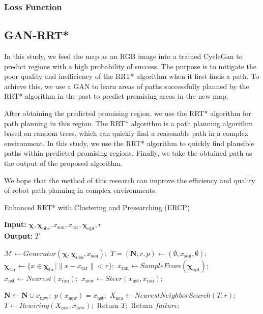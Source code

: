 \documentclass[smallcondensed]{svjour3}     %
\begin{document}
\subsubsection{Loss Function}


\subsection{GAN-RRT*}
In this study, we feed the map as an RGB image into a trained CycleGan to predict regions with a high probability of success. 
The purpose is to mitigate the poor quality and inefficiency of the RRT* algorithm when it first finds a path. 
To achieve this, we use a GAN to learn areas of paths successfully planned by the RRT* algorithm in the past to predict promising areas in the new map.

After obtaining the predicted promising region, we use the RRT* algorithm for path planning in this region.
The RRT* algorithm is a path planning algorithm based on random trees, which can quickly find a reasonable path in a complex environment. 
In this study, we use the RRT* algorithm to quickly find plausible paths within predicted promising regions. 
Finally, we take the obtained path as the output of the proposed algorithm.

We hope that the method of this research can improve the efficiency and quality of robot path planning in complex environments.

\begin{algorithm}
	\caption{Enhanced RRT* with Clustering and Presearching (ERCP)}
	\label{algorithm: ercp-RRT*}
	\hspace*{0.02in} {\bf Input:} $\bm{\chi}, \bm{\chi}_{\textrm{obs}}, x_{\textrm{sou}}, x_{\textrm{tar}}, \bm{\chi}_{\textrm{opt}}, r$ \\
	\hspace*{0.02in} {\bf Output:} $T$
	\begin{algorithmic}[1]
		\State $\mathcal{M} \leftarrow Generator(\bm{\chi}, \bm{\chi}_{\textrm{obs}}, x_{\textrm{sou}}); $
		\State $T = (\mathbf{N}, r, p) \leftarrow (\emptyset, x_{\textrm{sou}}, \emptyset) ;$
		\State $\bm{\chi}_{\textrm{tar}} \leftarrow \{x \in \bm{\chi}_{\textrm{fre}} \vert \lVert x - x_{\textrm{tar}} \rVert < r\} ;$
			\State $x_{\textrm{ran}} \leftarrow SampleFrom(\bm{\chi}_{\textrm{opt}}) ;$
			\State $x_{\textrm{nst}} \leftarrow Nearest(x_{\textrm{ran}}) ;$
			\State $x_{\textrm{new}} \leftarrow Steer(x_{\textrm{nst}}, x_{\textrm{ran}}) ;$

				\State $\mathbf{N} \leftarrow \mathbf{N} \cup x_{\textrm{new}} ;$
				\State $p(x_{\textrm{new}}) = x_{\textrm{nst}} ;$
				\State $X_{\textrm{nea}} \leftarrow NearestNeighborSearch(T, r) ;$
				\State $T \leftarrow Rewiring(X_{\textrm{nea}}, x_{\textrm{new}}) ;$
					\State Return $T ;$
				\EndIf
			\EndIf
		\EndFor
		\State Return $failure ;$
	\end{algorithmic}
\end{algorithm}
\end{document}
